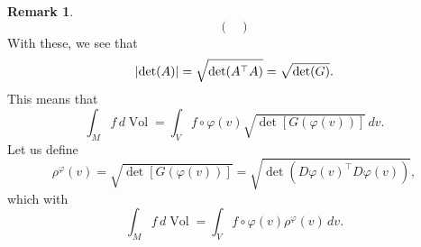 \documentclass{article}
\theoremstyle{definition}
\renewcommand\det{\operatorname{det}}
\theoremstyle{theorem}
\newtheorem{remark}{Remark}
\newcommand{\Vol}{\operatorname{Vol}}
\begin{document}
\begin{remark}
\begin{equation*}
\begin{pmatrix}
    \end{pmatrix}
\end{equation*}
With these, we see that 
\begin{equation*}
    \abs{\det(A)} = \sqrt{\det(A^\top A)} = \sqrt{\det(G)}.
\end{equation*}
This means that 
\begin{equation*}
    \int_M f\,d\Vol = \int_V f\circ \varphi(v) \sqrt{\det[G(\varphi(v))]}\,dv.
\end{equation*}
Let us define
\begin{equation*}
    \rho^{\varphi}(v) = \sqrt{\det[G(\varphi(v))]} = \sqrt{\det( D \varphi(v)^\top D \varphi(v))},
\end{equation*}
which with
\begin{equation*}
    \int_M f\,d\Vol = \int_V f\circ \varphi(v) \rho^{\varphi}(v)\,dv.
\end{equation*}
\end{remark}
\end{document}
